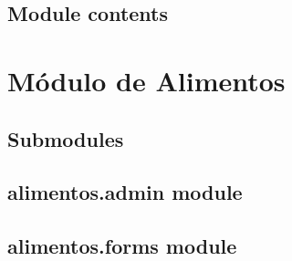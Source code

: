 \documentclass[letterpaper,10pt,spanish]{sphinxmanual}
\begin{document}
\subsection{Module contents}
\label{SIDGV:module-SIDGV}\label{SIDGV:module-contents}

\begin{fulllineitems}
\label{SIDGV:SIDGV.reverse_decorator}
\end{fulllineitems}



\section{Módulo de Alimentos}
\label{alimentos:alimentos-package}\label{alimentos::doc}

\subsection{Submodules}
\label{alimentos:submodules}

\subsection{alimentos.admin module}
\label{alimentos:alimentos-admin-module}\label{alimentos:module-alimentos.admin}

\subsection{alimentos.forms module}
\label{alimentos:module-alimentos.forms}\label{alimentos:alimentos-forms-module}
\end{document}
